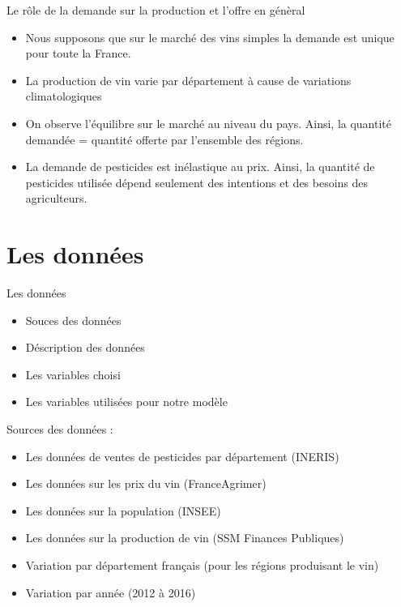 \documentclass[11pt,ignorenonframetext,]{beamer}
\providecommand{\tightlist}{%
  \setlength{\itemsep}{0pt}\setlength{\parskip}{0pt}}
\begin{document}
\begin{frame}{Le rôle de la demande sur la production et l'offre en
génèral}
\protect\hypertarget{le-role-de-la-demande-sur-la-production-et-loffre-en-general}{}

\begin{itemize}
\tightlist
\item
  Nous supposons que sur le marché des vins simples la demande est
  unique pour toute la France.
\item
  La production de vin varie par département à cause de variations
  climatologiques
\item
  On observe l'équilibre sur le marché au niveau du pays. Ainsi, la
  quantité demandée = quantité offerte par l'ensemble des régions.
\item
  La demande de pesticides est inélastique au prix. Ainsi, la quantité
  de pesticides utilisée dépend seulement des intentions et des besoins
  des agriculteurs.
\end{itemize}

\end{frame}

\hypertarget{les-donnees}{%
\section{Les données}\label{les-donnees}}

\begin{frame}{Les données}
\protect\hypertarget{les-donnees-1}{}

\begin{itemize}
\tightlist
\item
  Souces des données
\item
  Déscription des données
\item
  Les variables choisi
\item
  Les variables utilisées pour notre modèle
\end{itemize}

\end{frame}

\begin{frame}{Sources des données :}
\protect\hypertarget{sources-des-donnees}{}

\begin{itemize}
\tightlist
\item
  Les données de ventes de pesticides par département (INERIS)
\item
  Les données sur les prix du vin (FranceAgrimer)
\item
  Les données sur la population (INSEE)
\item
  Les données sur la production de vin (SSM Finances Publiques)
\item
  Variation par département français (pour les régions produisant le
  vin)
\item
  Variation par année (2012 à 2016)
\end{itemize}

\end{frame}
\end{document}
